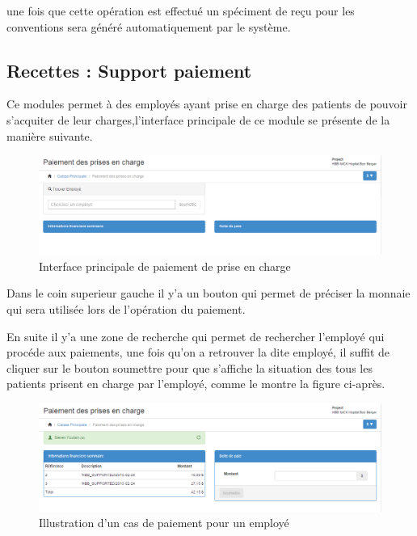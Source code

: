 \documentclass[12pt,a4paper]{report}
\begin{document}
une fois que cette opération est effectué un spéciment de reçu pour les conventions sera généré automatiquement par le système.


\newpage
\subsection{Recettes : Support paiement}
Ce modules permet à des employés ayant prise en charge des patients de pouvoir s'acquiter de leur charges,l'interface principale de ce module se présente de la manière suivante.

\begin{figure}[h]
\begin{center}
\includegraphics[width=14cm]{pic/InterFacePriseCharge.png}
\end{center}
\caption{Interface principale de paiement de prise en charge}
\label{Interface principale de paiement de prise en charge}
\end{figure}

Dans le coin superieur gauche il y'a un bouton qui permet de préciser la monnaie qui sera utilisée lors de l'opération du paiement.

En suite il y'a une zone de recherche qui permet de rechercher l'employé qui procéde aux paiements, une fois qu'on a retrouver la dite employé, il suffit de cliquer sur le bouton soumettre pour que s'affiche la situation des tous les patients prisent en charge par l'employé, comme le montre la figure ci-après.


\begin{figure}[h]
\begin{center}
\includegraphics[width=14cm]{pic/PaiemPriseChargeEmploy.png}
\end{center}
\caption{Illustration d'un cas de paiement pour un employé}
\label{Illustration d'un cas de paiement pour un employé}
\end{figure}
 
\end{document}
